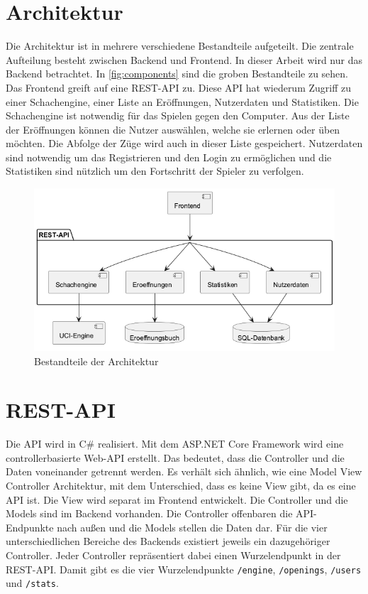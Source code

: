 \section{Architektur}
Die Architektur ist in mehrere verschiedene Bestandteile aufgeteilt. Die zentrale Aufteilung besteht zwischen Backend und Frontend. In dieser Arbeit wird nur das Backend betrachtet. In \autoref{fig:components} sind die groben Bestandteile zu sehen. Das Frontend greift auf eine \ac{REST}-API zu. Diese API hat wiederum Zugriff zu einer Schachengine, einer Liste an Eröffnungen, Nutzerdaten und Statistiken. Die Schachengine ist notwendig für das Spielen gegen den Computer. Aus der Liste der Eröffnungen können die Nutzer auswählen, welche sie erlernen oder üben möchten. Die Abfolge der Züge wird auch in dieser Liste gespeichert. Nutzerdaten sind notwendig um das Registrieren und den Login zu ermöglichen und die Statistiken sind nützlich um den Fortschritt der Spieler zu verfolgen.

\begin{figure}[h]
    \includegraphics[width=\linewidth]{images/diagrams/components.png}
    \caption{Bestandteile der Architektur}
    \label{fig:components}
\end{figure}

\section{REST-API}
Die API wird in C\# realisiert. Mit dem ASP.NET Core Framework wird eine controllerbasierte Web-API erstellt. Das bedeutet, dass die Controller und die Daten voneinander getrennt werden. Es verhält sich ähnlich, wie eine Model View Controller Architektur, mit dem Unterschied, dass es keine View gibt, da es eine API ist. Die View wird separat im Frontend entwickelt. Die Controller und die Models sind im Backend vorhanden. Die Controller offenbaren die API-Endpunkte nach außen und die Models stellen die Daten dar. Für die vier unterschiedlichen Bereiche des Backends existiert jeweils ein dazugehöriger Controller. Jeder Controller repräsentiert dabei einen Wurzelendpunkt in der REST-API. Damit gibt es die vier Wurzelendpunkte \lstinline{/engine}, \lstinline{/openings}, \lstinline{/users} und \lstinline{/stats}. 

